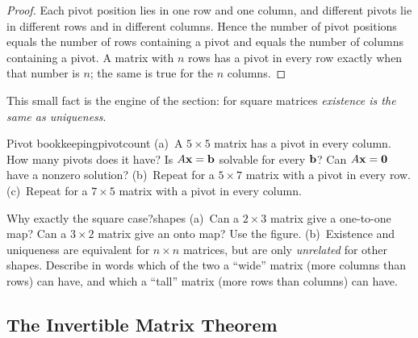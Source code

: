 \documentclass[11pt]{article}
\begin{document}
\begin{proof}
Each pivot position lies in one row and one column, and different pivots lie in different rows and in different columns. Hence the number of pivot positions equals the number of rows containing a pivot and equals the number of columns containing a pivot. A matrix with $n$ rows has a pivot in every row exactly when that number is $n$; the same is true for the $n$ columns.
\end{proof}

This small fact is the engine of the section: for square matrices \emph{existence is the same as uniqueness}.

\begin{kc}{Pivot bookkeeping}{pivotcount}
(a)~A $5\times5$ matrix has a pivot in every column. How many pivots does it have? Is $A\mathbf{x}=\mathbf{b}$ solvable for every $\mathbf{b}$? Can $A\mathbf{x}=\mathbf{0}$ have a nonzero solution? (b)~Repeat for a $5\times7$ matrix with a pivot in every row. (c)~Repeat for a $7\times5$ matrix with a pivot in every column.
\end{kc}

\begin{think}{Why exactly the square case?}{shapes}
(a)~Can a $2\times3$ matrix give a one-to-one map? Can a $3\times2$ matrix give an onto map? Use the figure. (b)~Existence and uniqueness are equivalent for $n\times n$ matrices, but are only \emph{unrelated} for other shapes. Describe in words which of the two a ``wide'' matrix (more columns than rows) can have, and which a ``tall'' matrix (more rows than columns) can have.
\end{think}

\subsection*{The Invertible Matrix Theorem}
\end{document}
